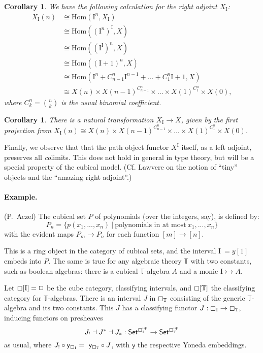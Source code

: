 \documentclass[11pt]{amsart}
\newcommand{\C}{\ensuremath{\boxempty}}
\newcommand{\T}{\ensuremath{\mathbb{T}}}
\newcommand{\psh}[1]{\ensuremath{\mathsf{Set}^{#1^{\mathrm{op}}}}}
\newcommand{\y}{\ensuremath{\mathsf{y}}} %
\newcommand{\mono}{\ensuremath{\rightarrowtail}}
\renewcommand{\to}{\ensuremath{\rightarrow}}
\renewcommand{\hom}{\ensuremath{\mathrm{Hom}}}
\newcommand{\I}{\ensuremath{\mathrm{I}}}
\renewcommand{\H}{\ensuremath{\Box}}
\newtheorem{corollary}[theorem]{Corollary}
\theoremstyle{remark}
\theoremstyle{definition}
\begin{document}
\begin{corollary}
We have the following calculation for the right adjoint $X_\I$:
\begin{align*}
X_\I(n) &\cong \hom(\I^n, X_\I) \\
&\cong \hom((\I^n)^\I, X) \\
&\cong \hom((\I^\I)^n, X) \\
&\cong \hom((\I+1)^n, X) \\
&\cong \hom(\I^n + C^n_{n-1}\I^{n-1} + \dots + C^n_{1}\I+1, X) \\
&\cong X(n) \times X(n-1)^{C^n_{n-1}} \times \dots \times X(1)^{C^n_{1}}\times X(0),
\end{align*}
where $C^n_{k} = \binom{n}{k}$ is the usual binomial coefficient.
\end{corollary}

\begin{corollary}
There is a natural transformation $X_\I \to X$, given by the first projection from $X_\I(n)\cong X(n) \times X(n-1)^{C^n_{n-1}} \times \dots \times X(1)^{C^n_{1}}\times X(0)$.
\end{corollary}

Finally, we observe that that the path object functor $X^\I$ itself, as a left adjoint, preserves all \emph{co}limits.  This does not hold in general in type theory, but will be a special property of the cubical model.  (Cf. Lawvere \cite{ATOM} on the notion of ``tiny'' objects and the ``amazing right adjoint''.)  

\paragraph{Example.} (P.~Aczel)
The cubical set $P$ of polynomials (over the integers, say), is defined by:
\[
P_n = \{ p(x_1, ...,  x_n)\ |\  \text{polynomials in at most}\  x_1, ..., x_n \}
\]
with the evident maps $P_m \to P_n$ for each function $[m] \to [n]$.

This is a ring object in the category of cubical sets, and the interval $\I\ = y[1]$ embeds into $P$.
The same is true for any algebraic theory $\T$ with two constants, such as boolean algebras: there is a cubical $\T$-algebra $A$ and a monic $\I \mono A$.

Let $\C[\I] = \H$ be the cube category, classifying intervals, and $\C[\T]$ the classifying category for $\T$-algebras.  There is an interval $J$ in $\C_\T$  consisting of the generic $\T$-algebra and its two constants.  This $J$ has a classifying functor $J : \C_\I \to \C_\T$, inducing functors on presheaves
\[
J_! \dashv J^* \dashv J_* : \psh{\C_\I} \to \psh{\C_\T}
\]
as usual, where $J_! \circ \y_{\C_\I} =\ \y_{\C_\T} \circ J$,  with $\y$ the respective Yoneda embeddings.
\end{document}
